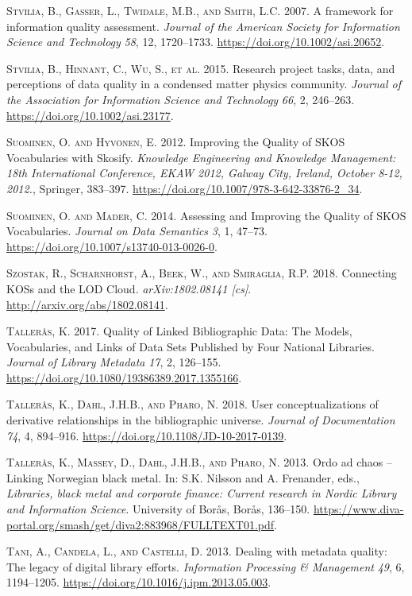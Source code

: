 \textsc{Stvilia, B., Gasser, L., Twidale, M.B., and Smith, L.C.} 2007. A framework for information quality assessment. \emph{Journal of the American Society for Information Science and Technology} \emph{58}, 12, 1720–1733. \url{https://doi.org/10.1002/asi.20652}.

\textsc{Stvilia, B., Hinnant, C., Wu, S., et al.} 2015. Research project tasks, data, and perceptions of data quality in a condensed matter physics community. \emph{Journal of the Association for Information Science and Technology} \emph{66}, 2, 246–263. \url{https://doi.org/10.1002/asi.23177}.

\textsc{Suominen, O. and Hyvönen, E.} 2012. Improving the Quality of SKOS Vocabularies with Skosify. \emph{Knowledge Engineering and Knowledge Management: 18th International Conference, EKAW 2012, Galway City, Ireland, October 8-12, 2012.}, Springer, 383–397. \url{https://doi.org/10.1007/978-3-642-33876-2_34}.

\textsc{Suominen, O. and Mader, C.} 2014. Assessing and Improving the Quality of SKOS Vocabularies. \emph{Journal on Data Semantics} \emph{3}, 1, 47–73. \url{https://doi.org/10.1007/s13740-013-0026-0}.

\textsc{Szostak, R., Scharnhorst, A., Beek, W., and Smiraglia, R.P.} 2018. Connecting KOSs and the LOD Cloud. \emph{arXiv:1802.08141 [cs]}. \url{http://arxiv.org/abs/1802.08141}.

\textsc{Tallerås, K.} 2017. Quality of Linked Bibliographic Data: The Models, Vocabularies, and Links of Data Sets Published by Four National Libraries. \emph{Journal of Library Metadata} \emph{17}, 2, 126–155. \url{https://doi.org/10.1080/19386389.2017.1355166}.

\textsc{Tallerås, K., Dahl, J.H.B., and Pharo, N.} 2018. User conceptualizations of derivative relationships in the bibliographic universe. \emph{Journal of Documentation} \emph{74}, 4, 894–916. \url{https://doi.org/10.1108/JD-10-2017-0139}.

\textsc{Tallerås, K., Massey, D., Dahl, J.H.B., and Pharo, N.} 2013. Ordo ad chaos – Linking Norwegian black metal. In: S.K. Nilsson and A. Frenander, eds., \emph{Libraries, black metal and corporate finance: Current research in Nordic Library and Information Science}. University of Borås, Borås, 136–150. \url{https://www.diva-portal.org/smash/get/diva2:883968/FULLTEXT01.pdf}.

\textsc{Tani, A., Candela, L., and Castelli, D.} 2013. Dealing with metadata quality: The legacy of digital library efforts. \emph{Information Processing \& Management} \emph{49}, 6, 1194–1205. \url{https://doi.org/10.1016/j.ipm.2013.05.003}.

